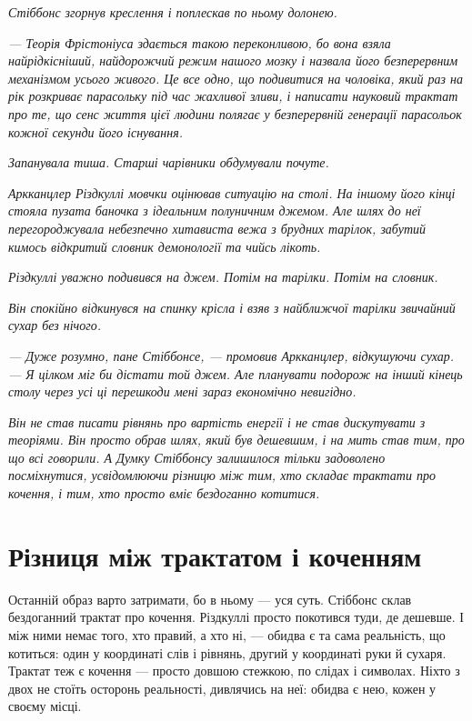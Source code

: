 \documentclass[12pt, a4paper, openany]{book}
\begin{document}
\begin{terrybox}
\textit{Стіббонс згорнув креслення і поплескав по ньому долонею.}

\textit{--- Теорія Фрістоніуса здається такою переконливою, бо вона взяла найрідкісніший, найдорожчий режим нашого мозку і назвала його безперервним механізмом усього живого. Це все одно, що подивитися на чоловіка, який раз на рік розкриває парасольку під час жахливої зливи, і написати науковий трактат про те, що сенс життя цієї людини полягає у безперервній генерації парасольок кожної секунди його існування.}

\textit{Запанувала тиша. Старші чарівники обдумували почуте.}

\textit{Аркканцлер Різдкуллі мовчки оцінював ситуацію на столі. На іншому його кінці стояла пузата баночка з ідеальним полуничним джемом. Але шлях до неї перегороджувала небезпечно хитависта вежа з брудних тарілок, забутий кимось відкритий словник демонології та чийсь лікоть.}

\textit{Різдкуллі уважно подивився на джем. Потім на тарілки. Потім на словник.}

\textit{Він спокійно відкинувся на спинку крісла і взяв з найближчої тарілки звичайний сухар без нічого.}

\textit{--- Дуже розумно, пане Стіббонсе, --- промовив Аркканцлер, відкушуючи сухар. --- Я цілком міг би дістати той джем. Але планувати подорож на інший кінець столу через усі ці перешкоди мені зараз економічно невигідно.}

\textit{Він не став писати рівнянь про вартість енергії і не став дискутувати з теоріями. Він просто обрав шлях, який був дешевшим, і на мить став тим, про що всі говорили. А Думку Стіббонсу залишилося тільки задоволено посміхнутися, усвідомлюючи різницю між тим, хто складає трактати про кочення, і тим, хто просто вміє бездоганно котитися.}
\end{terrybox}

\section{Різниця між трактатом і коченням}

Останній образ варто затримати, бо в ньому --- уся суть. Стіббонс склав бездоганний трактат про кочення. Різдкуллі просто покотився туди, де дешевше. І між ними немає того, хто правий, а хто ні, --- обидва є та сама реальність, що котиться: один у координаті слів і рівнянь, другий у координаті руки й сухаря. Трактат теж є кочення --- просто довшою стежкою, по слідах і символах. Ніхто з двох не стоїть осторонь реальності, дивлячись на неї: обидва є нею, кожен у своєму місці.
\end{document}
